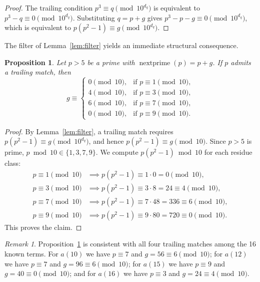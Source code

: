 \documentclass[12pt,reqno]{article}
\theoremstyle{plain}
\newtheorem{proposition}[theorem]{Proposition}
\theoremstyle{definition}
\theoremstyle{remark}
\newtheorem{remark}[theorem]{Remark}
\newcommand{\np}{\operatorname{nextprime}}
\begin{document}
\begin{proof}
The trailing condition $p^3 \equiv q \pmod{10^{d_q}}$ is equivalent
to $p^3 - q \equiv 0 \pmod{10^{d_q}}$.
Substituting $q = p + g$ gives
$p^3 - p - g \equiv 0 \pmod{10^{d_q}}$,
which is equivalent to $p(p^2 - 1) \equiv g \pmod{10^{d_q}}$.
\end{proof}

The filter of Lemma~\ref{lem:filter} yields an immediate structural
consequence.

\begin{proposition}
\label{prop:mod10}
Let $p > 5$ be a prime with $\np(p) = p + g$.
If $p$ admits a trailing match, then
\[
 g \equiv \begin{cases}
 0 \pmod{10}, & \text{if } p \equiv 1 \pmod{10}, \\
 4 \pmod{10}, & \text{if } p \equiv 3 \pmod{10}, \\
 6 \pmod{10}, & \text{if } p \equiv 7 \pmod{10}, \\
 0 \pmod{10}, & \text{if } p \equiv 9 \pmod{10}.
 \end{cases}
\]
\end{proposition}

\begin{proof}
By Lemma~\ref{lem:filter}, a trailing match requires
$p(p^2 - 1) \equiv g \pmod{10^{d_q}}$, and hence
$p(p^2 - 1) \equiv g \pmod{10}$.
Since $p > 5$ is prime, $p \bmod 10 \in \{1, 3, 7, 9\}$.
We compute $p(p^2 - 1) \bmod 10$ for each residue class:
\begin{align*}
 p \equiv 1 \pmod{10} &\implies p(p^2 - 1) \equiv 1 \cdot 0 = 0 \pmod{10}, \\
 p \equiv 3 \pmod{10} &\implies p(p^2 - 1) \equiv 3 \cdot 8 = 24 \equiv 4 \pmod{10}, \\
 p \equiv 7 \pmod{10} &\implies p(p^2 - 1) \equiv 7 \cdot 48 = 336 \equiv 6 \pmod{10}, \\
 p \equiv 9 \pmod{10} &\implies p(p^2 - 1) \equiv 9 \cdot 80 = 720 \equiv 0 \pmod{10}.
\end{align*}
This proves the claim.
\end{proof}

\begin{remark}
Proposition~\ref{prop:mod10} is consistent with all four trailing
matches among the 16 known terms.
For $a(10)$ we have $p \equiv 7$ and $g = 56 \equiv 6 \pmod{10}$;
for $a(12)$ we have $p \equiv 7$ and $g = 96 \equiv 6 \pmod{10}$;
for $a(15)$ we have $p \equiv 9$ and $g = 40 \equiv 0 \pmod{10}$;
and for $a(16)$ we have $p \equiv 3$ and $g = 24 \equiv 4 \pmod{10}$.
\end{remark}
\end{document}
